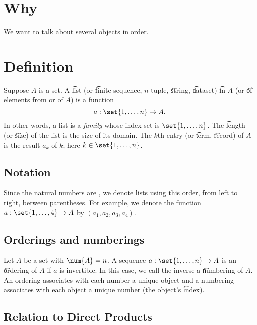 

\section*{Why}

We want to talk about several objects in order.

\section*{Definition}

Suppose $A$ is a set.
A \t{list} (or \t{finite sequence}, \t{$n$-tuple}, \t{string}, \t{dataset}) \t{in} $A$ (or \t{of} elements from or of $A$) is a function
    \[
a: \set{1, \dots , n} \to A.
    \]
In other words, a list is a \textit{family} whose index set is $\set{1, \dots , n}$.
The \t{length} (or \t{size}) of the list is the size of its domain.
The \t{$k$th entry} (or \t{term}, \t{record}) of $A$ is the result $a_k$ of $k$; here $k \in \set{1, \dots , n}$.

\subsection*{Notation}

Since the natural numbers are , we denote lists using this order, from left to right, between parentheses.
For example, we denote the function $a: \set{1, \dots , 4} \to A$ by $(a_1, a_2, a_3, a_4)$.

\subsection*{Orderings and numberings}

Let $A$ be a set with $\num{A} = n$.
A sequence $a: \set{1, \dots , n} \to A$ is an \t{ordering} of $A$ if $a$ is invertible.
In this case, we call the inverse a \t{numbering} of $A$.
An ordering associates with each number a unique object and a numbering associates with each object a unique number (the object's \t{index}).

\subsection*{Relation to Direct Products}

